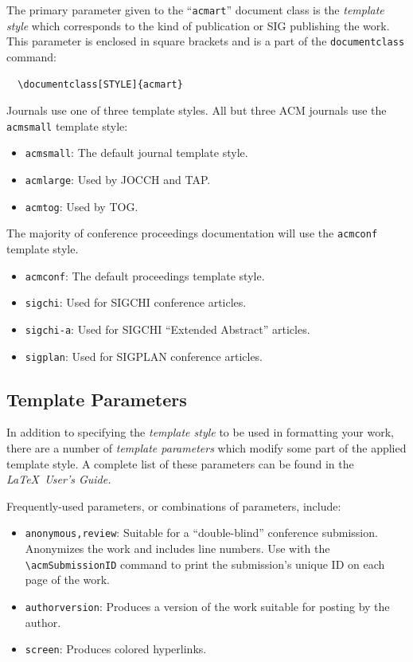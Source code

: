 \documentclass[sigconf]{acmart}
\begin{document}
The primary parameter given to the ``\verb|acmart|'' document class is
the {\itshape template style} which corresponds to the kind of publication
or SIG publishing the work. This parameter is enclosed in square
brackets and is a part of the {\verb|documentclass|} command:
\begin{verbatim}
  \documentclass[STYLE]{acmart}
\end{verbatim}

Journals use one of three template styles. All but three ACM journals
use the {\verb|acmsmall|} template style:
\begin{itemize}
\item {\verb|acmsmall|}: The default journal template style.
\item {\verb|acmlarge|}: Used by JOCCH and TAP.
\item {\verb|acmtog|}: Used by TOG.
\end{itemize}

The majority of conference proceedings documentation will use the {\verb|acmconf|} template style.
\begin{itemize}
\item {\verb|acmconf|}: The default proceedings template style.
\item{\verb|sigchi|}: Used for SIGCHI conference articles.
\item{\verb|sigchi-a|}: Used for SIGCHI ``Extended Abstract'' articles.
\item{\verb|sigplan|}: Used for SIGPLAN conference articles.
\end{itemize}

\subsection{Template Parameters}

In addition to specifying the {\itshape template style} to be used in
formatting your work, there are a number of {\itshape template parameters}
which modify some part of the applied template style. A complete list
of these parameters can be found in the {\itshape \LaTeX\ User's Guide.}

Frequently-used parameters, or combinations of parameters, include:
\begin{itemize}
\item {\verb|anonymous,review|}: Suitable for a ``double-blind''
  conference submission. Anonymizes the work and includes line
  numbers. Use with the \verb|\acmSubmissionID| command to print the
  submission's unique ID on each page of the work.
\item{\verb|authorversion|}: Produces a version of the work suitable
  for posting by the author.
\item{\verb|screen|}: Produces colored hyperlinks.
\end{itemize}
\end{document}
